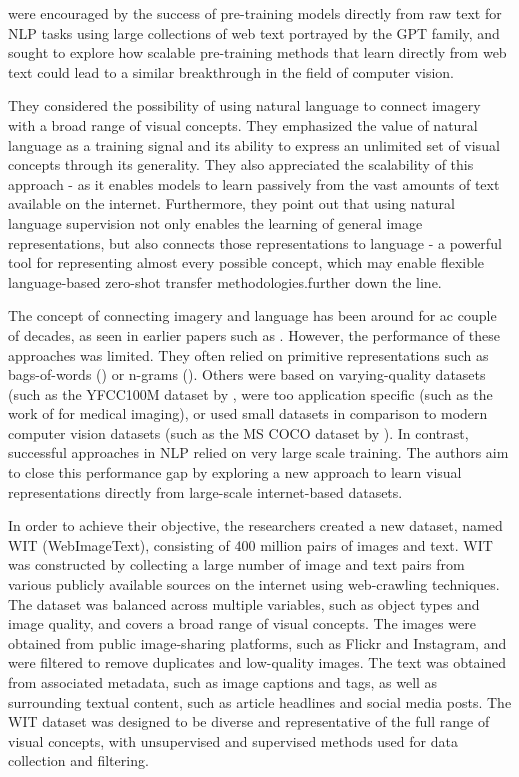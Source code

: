 \documentclass{article}
\begin{document}
\citet{radford2021clip} were encouraged by the success of pre-training models directly from raw text for NLP tasks using large collections of web text portrayed by the GPT family, and sought to explore how scalable pre-training methods that learn directly from web text could lead to a similar breakthrough in the field of computer vision. 

\medskip
\noindent
They considered the possibility of using natural language to connect imagery with a broad range of visual concepts. They emphasized the value of natural language as a training signal and its ability to express an unlimited set of visual concepts through its generality. They also appreciated the scalability of this approach - as it enables models to learn passively from the vast amounts of text available on the internet. Furthermore, they point out that using natural language supervision not only enables the learning of general image representations, but also connects those representations to language - a powerful tool for representing almost every possible concept, which may enable flexible language-based zero-shot transfer methodologies.further down the line.

\medskip
\noindent
The concept of connecting imagery and language has been around for ac couple of decades, as seen in earlier papers such as \citet{mori1999image}. However, the performance of these approaches was limited. They often relied on primitive representations such as bags-of-words (\citet{joulin2016learning}) or n-grams (\citet{li2017learning}). Others were based on varying-quality datasets (such as the YFCC100M dataset by \citet{thomee2016yfcc100m}, were too application specific (such as the work of \citet{zhang2022contrastive} for medical imaging), or used small datasets in comparison to modern computer vision datasets (such as the MS COCO dataset by \citet{lin2014mscoco}). In contrast, successful approaches in NLP relied on very large scale training. The authors aim to close this performance gap by exploring a new approach to learn visual representations directly from large-scale internet-based datasets. 

\medskip
\noindent
In order to achieve their objective, the researchers created a new dataset, named WIT (WebImageText), consisting of 400 million pairs of images and text. WIT was constructed by collecting a large number of image and text pairs from various publicly available sources on the internet using web-crawling techniques. The dataset was balanced across multiple variables, such as object types and image quality, and covers a broad range of visual concepts. The images were obtained from public image-sharing platforms, such as Flickr and Instagram, and were filtered to remove duplicates and low-quality images. The text was obtained from associated metadata, such as image captions and tags, as well as surrounding textual content, such as article headlines and social media posts. The WIT dataset was designed to be diverse and representative of the full range of visual concepts, with unsupervised and supervised methods used for data collection and filtering.
 
\end{document}
